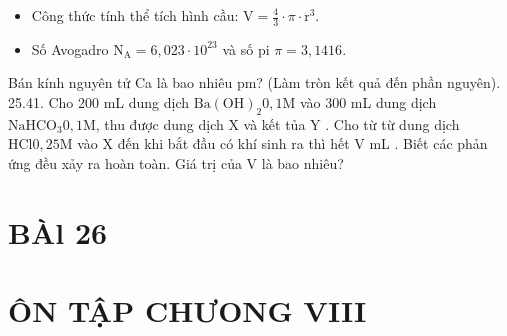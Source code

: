 \documentclass[10pt]{article}
\begin{document}
\begin{itemize}
  \item Công thức tính thể tích hình cầu: $\mathrm{V}=\frac{4}{3} \cdot \pi \cdot \mathrm{r}^{3}$.
  \item Số Avogadro $\mathrm{N}_{\mathrm{A}}=6,023 \cdot 10^{23}$ và số pi $\pi=3,1416$.
\end{itemize}

Bán kính nguyên tử Ca là bao nhiêu pm? (Làm tròn kết quả đến phần nguyên).\\
25.41. Cho 200 mL dung dịch $\mathrm{Ba}(\mathrm{OH})_{2} 0,1 \mathrm{M}$ vào 300 mL dung dịch $\mathrm{NaHCO}_{3} 0,1 \mathrm{M}$, thu được dung dịch X và kết tủa Y . Cho từ từ dung dịch $\mathrm{HCl} 0,25 \mathrm{M}$ vào X đến khi bắt đầu có khí sinh ra thì hết V mL . Biết các phản ứng đều xảy ra hoàn toàn. Giá trị của V là bao nhiêu?

\section*{BÀl 26}
\section*{ÔN TẬP CHƯONG VIII}
\end{document}
